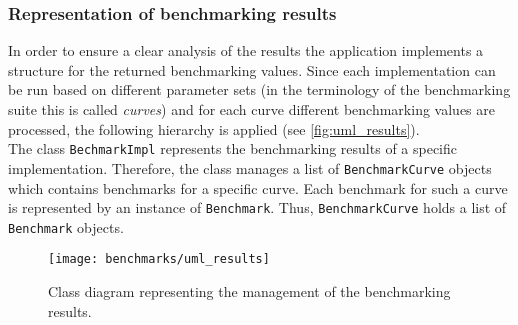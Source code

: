 \subsubsection{Representation of benchmarking results}
In order to ensure a clear analysis of the results the application implements a structure for the returned benchmarking values. Since each implementation can be run based on different parameter sets (in the terminology of the benchmarking suite this is called \textit{curves}) and for each curve different benchmarking values are processed, the following hierarchy is applied (see \autoref{fig:uml_results}).\\
The class \texttt{BechmarkImpl} represents the benchmarking results of a specific implementation. Therefore, the class manages a list of \texttt{BenchmarkCurve} objects which contains benchmarks for a specific curve. Each benchmark for such a curve is represented by an instance of \texttt{Benchmark}. Thus, \texttt{BenchmarkCurve} holds a list of \texttt{Benchmark} objects.
\begin{figure}[H]
  \centering
  \texttt{[image: benchmarks/uml\_results]}
  \caption[Class diagram for benchmarking results.]
  {Class diagram representing the management of the benchmarking results.}\label{fig:uml_results}
\end{figure}

